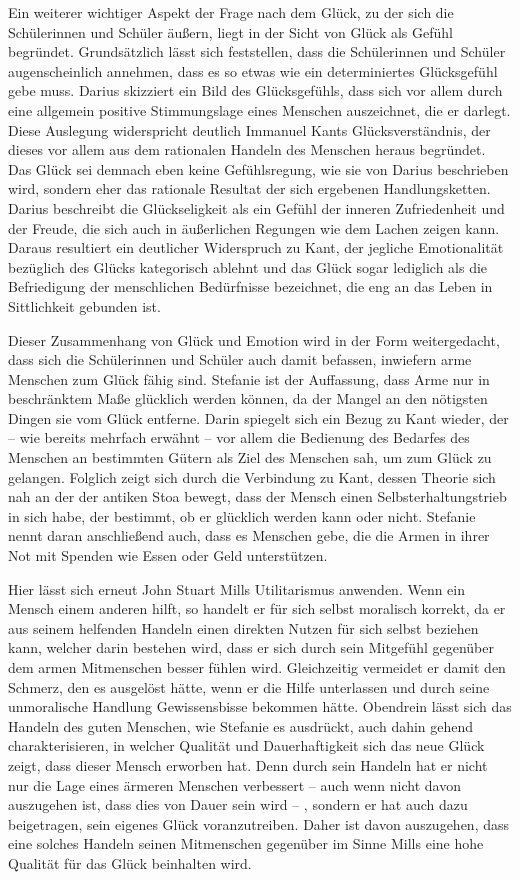 Ein weiterer wichtiger Aspekt der Frage nach dem Glück, zu der sich die Schülerinnen und Schüler äußern, liegt in der Sicht von Glück als Gefühl begründet. 
Grundsätzlich lässt sich feststellen, dass die Schülerinnen und Schüler augenscheinlich annehmen, dass es so etwas wie ein determiniertes Glücksgefühl gebe muss.
Darius skizziert ein Bild des Glücksgefühls, dass sich vor allem durch eine allgemein positive Stimmungslage eines Menschen auszeichnet, die er darlegt.
Diese Auslegung widerspricht deutlich Immanuel Kants Glücksverständnis, der dieses vor allem aus dem rationalen Handeln des Menschen heraus begründet. 
Das Glück sei demnach eben keine Gefühlsregung, wie sie von Darius beschrieben wird, sondern eher das rationale Resultat der sich ergebenen Handlungsketten. 
Darius beschreibt die Glückseligkeit als ein Gefühl der inneren Zufriedenheit und der Freude, die sich auch in äußerlichen Regungen wie dem Lachen zeigen kann. 
Daraus resultiert ein deutlicher Widerspruch zu Kant, der jegliche Emotionalität bezüglich des Glücks kategorisch ablehnt und das Glück sogar lediglich als die Befriedigung der menschlichen Bedürfnisse bezeichnet, die eng an das Leben in Sittlichkeit gebunden ist. 

Dieser Zusammenhang von Glück und Emotion wird  in der Form weitergedacht, dass sich die Schülerinnen und Schüler auch damit befassen, inwiefern arme Menschen zum Glück fähig sind. 
Stefanie ist der Auffassung, dass Arme nur in beschränktem Maße glücklich werden können, da der Mangel an den nötigsten Dingen sie vom Glück entferne. 
Darin spiegelt sich ein Bezug zu Kant wieder, der -- wie bereits mehrfach erwähnt -- vor allem die Bedienung des Bedarfes des Menschen an bestimmten Gütern als Ziel des Menschen sah, um zum Glück zu gelangen. 
Folglich zeigt sich durch die Verbindung zu Kant, dessen Theorie sich nah an der der antiken Stoa bewegt, dass der Mensch einen Selbsterhaltungstrieb in sich habe, der bestimmt, ob er glücklich werden kann oder nicht. 
Stefanie nennt daran anschließend auch, dass es Menschen gebe, die die Armen in ihrer Not mit Spenden wie Essen oder Geld unterstützen. 

Hier lässt sich erneut John Stuart Mills Utilitarismus anwenden. 
Wenn ein Mensch einem anderen hilft, so handelt er für sich selbst moralisch korrekt, da er aus seinem helfenden Handeln einen direkten Nutzen für sich selbst beziehen kann, welcher darin bestehen wird, dass er sich durch sein Mitgefühl gegenüber dem armen Mitmenschen besser fühlen wird. 
Gleichzeitig vermeidet er damit den Schmerz, den es ausgelöst hätte, wenn er die Hilfe unterlassen und durch seine unmoralische Handlung Gewissensbisse bekommen hätte. 
Obendrein lässt sich das Handeln des guten Menschen, wie Stefanie es ausdrückt, auch dahin gehend charakterisieren, in welcher Qualität und Dauerhaftigkeit sich das neue Glück zeigt, dass dieser Mensch erworben hat. 
Denn durch sein Handeln hat er nicht nur die Lage eines ärmeren Menschen verbessert -- auch wenn nicht davon auszugehen ist, dass dies von Dauer sein wird -- , sondern er hat auch dazu beigetragen, sein eigenes Glück voranzutreiben. 
Daher ist davon auszugehen, dass eine solches Handeln seinen Mitmenschen gegenüber im Sinne Mills eine hohe Qualität für das Glück beinhalten wird.

